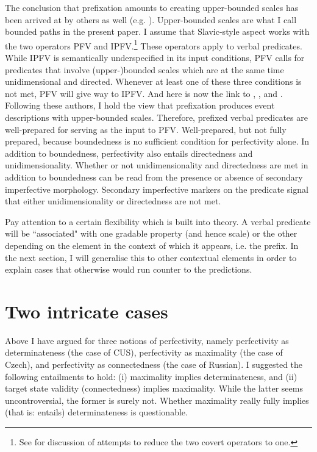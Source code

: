 \documentclass[output=paper,colorlinks,citecolor=brown]{langscibook}
\begin{document}
The conclusion that prefixation amounts to creating upper-bounded scales has been arrived at by others as well (e.g. \citealt{Filip2008,Gehrke2008}). 
Upper-bounded scales are what I call bounded paths in the present paper.
I assume that Slavic-style aspect works with the two 
operators PFV and IPFV.\footnote{See \citet{omr23} for discussion of attempts to reduce the two covert operators to one.} These operators apply to verbal predicates. While IPFV is semantically underspecified in its input conditions, PFV calls for predicates that involve (upper-)bounded scales which are at the same time unidimensional and directed. Whenever at least one of these three conditions is not met, PFV will give way to IPFV. 
And here is now the link to \citet{Filip2008}, \citet{Gehrke2008}, and \citet{Kagan15}. Following these authors, I hold the view that 
prefixation produces event descriptions with upper-bounded scales.
Therefore, prefixed verbal predicates are well-prepared for serving as the input to PFV. Well-prepared, but not fully prepared, because boundedness is no sufficient condition for perfectivity alone. In addition to boundedness, perfectivity also entails directedness and unidimensionality. 
Whether or not unidimensionality and directedness are met in addition to boundedness can be read from the presence or absence of secondary imperfective morphology. 
Secondary imperfective markers on the predicate signal that either unidimensionality or directedness are not met.  

Pay attention to a certain flexibility which is built into  theory. 
A verbal predicate will be ``associated" with one gradable property (and hence scale) or the other depending on the element in the context of which it appears, i.e. the prefix.  
In the next section, I will generalise this to other contextual elements in order to explain cases that otherwise would run counter to the predictions.  

\section{Two intricate cases}\label{mueller:sec:two}
Above I have argued for three notions of perfectivity, namely perfectivity as determinateness (the case of CUS), perfectivity as maximality (the case of Czech), and perfectivity as connectedness (the case of Russian). I suggested the following entailments to hold: (i) maximality implies determinateness, and (ii) target state validity (connectedness) implies maximality. While the latter seems uncontroversial, the former is surely not. 
Whether maximality really fully implies (that is: entails) determinateness is questionable. 
\end{document}

